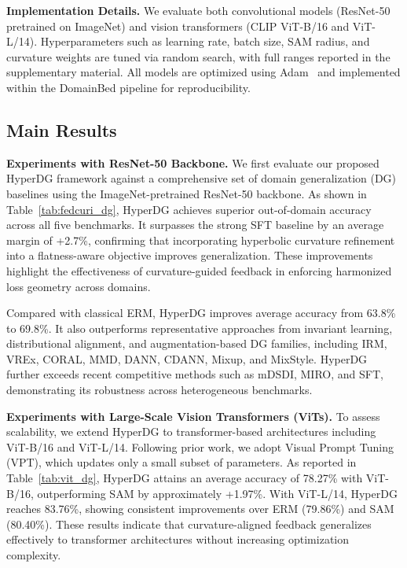 \documentclass[10pt]{article} %
\begin{document}
\textbf{Implementation Details.}
We evaluate both convolutional models (ResNet-50 pretrained on ImageNet) and 
vision transformers (CLIP ViT-B/16 and ViT-L/14). Hyperparameters such as 
learning rate, batch size, SAM radius, and curvature weights are tuned via 
random search, with full ranges reported in the supplementary material. 
All models are optimized using Adam~\cite{kingma2014adam} and implemented 
within the DomainBed pipeline for reproducibility.


\subsection{Main Results}

\textbf{Experiments with ResNet-50 Backbone.}
We first evaluate our proposed HyperDG framework against a comprehensive set of domain generalization (DG) baselines using the ImageNet-pretrained ResNet-50 backbone. As shown in Table~\ref{tab:fedcuri_dg}, HyperDG achieves superior out-of-domain accuracy across all five benchmarks. It surpasses the strong SFT baseline by an average margin of +2.7\%, confirming that incorporating hyperbolic curvature refinement into a flatness-aware objective improves generalization. These improvements highlight the effectiveness of curvature-guided feedback in enforcing harmonized loss geometry across domains.

Compared with classical ERM, HyperDG improves average accuracy from 63.8\% to 69.8\%. It also outperforms representative approaches from invariant learning, distributional alignment, and augmentation-based DG families, including IRM, VREx, CORAL, MMD, DANN, CDANN, Mixup, and MixStyle. HyperDG further exceeds recent competitive methods such as mDSDI, MIRO, and SFT, demonstrating its robustness across heterogeneous benchmarks.

\textbf{Experiments with Large-Scale Vision Transformers (ViTs).}
To assess scalability, we extend HyperDG to transformer-based architectures including ViT-B/16 and ViT-L/14. Following prior work, we adopt Visual Prompt Tuning (VPT), which updates only a small subset of parameters. As reported in Table~\ref{tab:vit_dg}, HyperDG attains an average accuracy of 78.27\% with ViT-B/16, outperforming SAM by approximately +1.97\%. With ViT-L/14, HyperDG reaches 83.76\%, showing consistent improvements over ERM (79.86\%) and SAM (80.40\%). These results indicate that curvature-aligned feedback generalizes effectively to transformer architectures without increasing optimization complexity.
\end{document}
